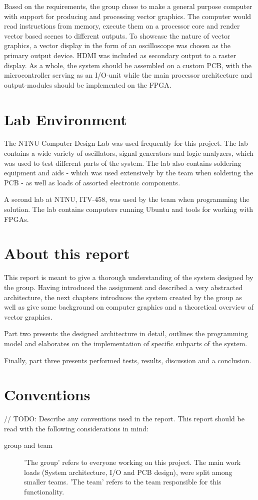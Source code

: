 Based on the requirements, the group chose to make a general purpose computer with support for producing and processing vector graphics.
The computer would read instructions from memory, execute them on a processor core and render vector based scenes to different outputs.
To showcase the nature of vector graphics, a vector display in the form of an oscilloscope was chosen as the primary output device.
HDMI was included as secondary output to a raster display.
As a whole, the system should be assembled on a custom PCB, with the microcontroller serving as an I/O-unit while the main processor architecture and output-modules should be implemented on the FPGA.

\section{Lab Environment}
The NTNU Computer Design Lab was used frequently for this project.
The lab contains a wide variety of oscillators, signal generators and logic analyzers, which was used to test different parts of the system.
The lab also contains soldering equipment and aids - which was used extensively by the team when soldering the PCB - as well as loads of assorted electronic components.

A second lab at NTNU, ITV-458, was used by the team when programming the solution.
The lab contains computers running Ubuntu and tools for working with FPGAs.

\section{About this report}
This report is meant to give a thorough understanding of the system designed by the group.
Having introduced the assignment and described a very abstracted architecture, the next chapters introduces the system created by the group as well as give some background on computer graphics and a theoretical overview of vector graphics.

Part two presents the designed architecture in detail, outlines the programming model and elaborates on the implementation of specific subparts of the system.

Finally, part three presents performed tests, results, discussion and a conclusion.

\section{Conventions}
// TODO: Describe any conventions used in the report.
This report should be read with the following considerations in mind:

\begin{description}
    \item[group and team] 'The group' refers to everyone working on this project. The main work loads (System architecture, I/O and PCB design), were split among smaller teams. 'The team' refers to the team responsible for this functionality.
\end{description}
